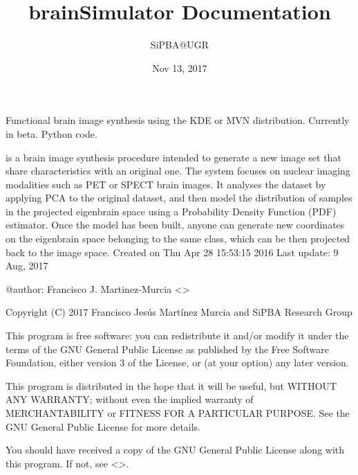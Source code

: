 \documentclass[letterpaper,10pt,english]{sphinxmanual}
\title{brainSimulator Documentation}
\date{Nov 13, 2017}
\author{SiPBA@UGR}
\begin{document}
\maketitle
\sphinxtableofcontents
{}\label{\detokenize{index::doc}}


Functional brain image synthesis using the KDE or MVN distribution. Currently in beta. Python code.

 is a brain image synthesis procedure intended to generate a new image set that share characteristics with an original one. The system focuses on nuclear imaging modalities such as PET or SPECT brain images. It analyses the dataset by applying PCA to the original dataset, and then model the distribution of samples in the projected eigenbrain space using a Probability Density Function (PDF) estimator. Once the model has been built, anyone can generate new coordinates on the eigenbrain space belonging to the same class, which can be then projected back to the image space.
\label{\detokenize{index:module-brainSimulator}}\label{\detokenize{index:module-brainSimulator}}
Created on Thu Apr 28 15:53:15 2016
Last update: 9 Aug, 2017

@author: Francisco J. Martinez-Murcia \textless{}\textgreater{}

Copyright (C) 2017 Francisco Jesús Martínez Murcia and SiPBA Research Group

This program is free software: you can redistribute it and/or modify
it under the terms of the GNU General Public License as published by
the Free Software Foundation, either version 3 of the License, or
(at your option) any later version.

This program is distributed in the hope that it will be useful,
but WITHOUT ANY WARRANTY; without even the implied warranty of
MERCHANTABILITY or FITNESS FOR A PARTICULAR PURPOSE.  See the
GNU General Public License for more details.

You should have received a copy of the GNU General Public License
along with this program.  If not, see \textless{}\textgreater{}.
\end{document}
